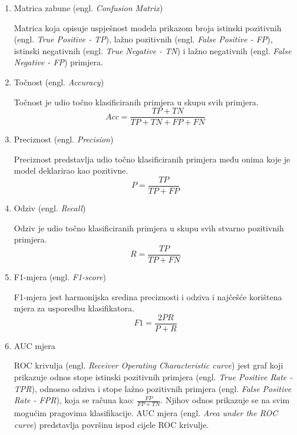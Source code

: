 \documentclass[utf8, diplomski, numeric]{fer}
\begin{document}
\begin{enumerate}
\item Matrica zabune (engl. \textit{Confusion Matrix})

Matrica koja opisuje uspješnost modela prikazom broja istinski pozitivnih (engl. \textit{True Positive - TP}), lažno pozitivnih (engl. \textit{False Positive - FP}), istinski negativnih (engl. \textit{True Negative - TN}) i lažno negativnih (engl.  \textit{False Negative - FP}) primjera.

\item Točnost (engl. \textit{Accuracy})

Točnost je udio točno klasificiranih primjera u skupu svih primjera.
\begin{equation*} \label{eq:accuracy}
Acc = \frac{TP+TN}{TP+TN+FP+FN}
\end{equation*}

\item Preciznost (engl. \textit{Precision})

Preciznost predstavlja udio točno klasificiranih primjera među onima koje je model deklarirao kao pozitivne.
\begin{equation*} \label{eq:precision}
P = \frac{TP}{TP+FP}
\end{equation*}

\item Odziv (engl. \textit{Recall})

Odziv je udio točno klasificiranih primjera u skupu svih stvarno pozitivnih primjera.
\begin{equation*} \label{eq:recall}
R = \frac{TP}{TP+FN}
\end{equation*}

\item F1-mjera (engl. \textit{F1-score})

F1-mjera jest harmonijska sredina preciznosti i odziva i najčešće korištena mjera za usporedbu klasifikatora.
\begin{equation*} \label{eq:f1}
F1 = \frac{2PR}{P+R}
\end{equation*}

\item AUC mjera

ROC krivulja (engl. \textit{Receiver Operating Characteristic curve}) jest graf koji prikazuje odnos stope istinski pozitivnih primjera (engl. \textit{True Positive Rate - TPR}), odnosno odziva i stope lažno pozitivnih primjera (engl. \textit{False Positive Rate - FPR}), koja se računa kao: 
\begin{math}
\frac{FP}{FP+TN}
\end{math}. Njihov odnos prikazuje se na svim mogućim pragovima klasifikacije. AUC mjera (engl. \textit{Area under the ROC curve}) predstavlja površinu ispod cijele ROC krivulje.


\end{enumerate}
\end{document}
